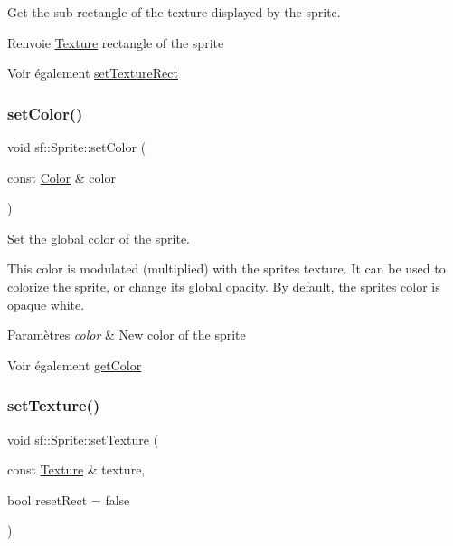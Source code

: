 Get the sub-\/rectangle of the texture displayed by the sprite. 

\begin{DoxyReturn}{Renvoie}
\hyperlink{classsf_1_1Texture}{Texture} rectangle of the sprite
\end{DoxyReturn}
\begin{DoxySeeAlso}{Voir également}
\hyperlink{classsf_1_1Sprite_a3fefec419a4e6a90c0fd54c793d82ec2}{set\+Texture\+Rect} 
\end{DoxySeeAlso}
\mbox{\label{classsf_1_1Sprite_a14def44da6437bfea20c4df5e71aba4c}} 
\subsubsection{\texorpdfstring{set\+Color()}{setColor()}}
{\footnotesize\ttfamily void sf\+::\+Sprite\+::set\+Color (\begin{DoxyParamCaption}\item[{const \hyperlink{classsf_1_1Color}{Color} \&}]{color }\end{DoxyParamCaption})}



Set the global color of the sprite. 

This color is modulated (multiplied) with the sprite\textquotesingle{}s texture. It can be used to colorize the sprite, or change its global opacity. By default, the sprite\textquotesingle{}s color is opaque white.


\begin{DoxyParams}{Paramètres}
{\em color} & New color of the sprite\\
\hline
\end{DoxyParams}
\begin{DoxySeeAlso}{Voir également}
\hyperlink{classsf_1_1Sprite_ac5f419f37b4e38f7a94186e3a3e303e1}{get\+Color} 
\end{DoxySeeAlso}
\mbox{\label{classsf_1_1Sprite_a3729c88d88ac38c19317c18e87242560}} 
\subsubsection{\texorpdfstring{set\+Texture()}{setTexture()}}
{\footnotesize\ttfamily void sf\+::\+Sprite\+::set\+Texture (\begin{DoxyParamCaption}\item[{const \hyperlink{classsf_1_1Texture}{Texture} \&}]{texture,  }\item[{bool}]{reset\+Rect = {\ttfamily false} }\end{DoxyParamCaption})}



